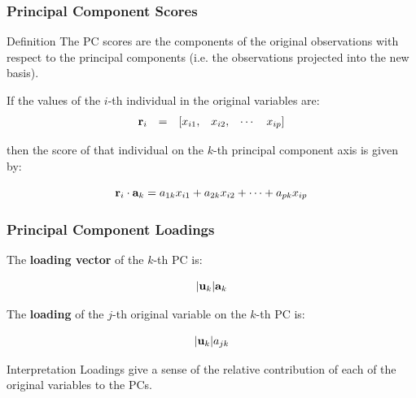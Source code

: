 \documentclass{beamer}
\begin{document}


\begin{frame}
  \frametitle{Principal Component Scores}

\begin{block}{Definition}
The PC scores are the components of the original observations with respect to the principal components (i.e. the observations projected into the new basis).
\end{block}
\medskip

If the values of the $i$-th individual in the original variables are:
\[
\begin{array}{cccccc}
\mathbf{r}_i & = & [x_{i1}, & x_{i2}, & \cdots & x_{ip}]
\end{array}
\]

then the score of that individual on the $k$-th principal component axis is given by:

\[
\mathbf{r}_i \cdot \mathbf{a}_k = a_{1k}x_{i1} + a_{2k}x_{i2} + \cdots + a_{pk}x_{ip}
\]

\end{frame}


\begin{frame}
  \frametitle{Principal Component Loadings}

The \textbf{loading vector} of the $k$-th PC is:

\[
|\mathbf{u}_k|\mathbf{a}_k
\]

The \textbf{loading} of the $j$-th original variable on the $k$-th PC is:

\[
|\mathbf{u}_k|a_{jk}
\]

\begin{block}{Interpretation}
Loadings give a sense of the relative contribution of each of the original variables to the PCs.
\end{block}

\end{frame}
\end{document}
